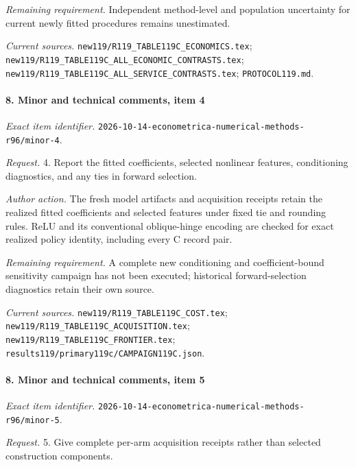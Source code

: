 \par\emph{Remaining requirement.} Independent method-level and population uncertainty for current newly fitted procedures remains unestimated.

\par\emph{Current sources.} \nolinkurl{new119/R119_TABLE119C_ECONOMICS.tex}; \nolinkurl{new119/R119_TABLE119C_ALL_ECONOMIC_CONTRASTS.tex}; \nolinkurl{new119/R119_TABLE119C_ALL_SERVICE_CONTRASTS.tex}; \nolinkurl{PROTOCOL119.md}.

\paragraph{8. Minor and technical comments, item 4}

\emph{Exact item identifier.} \nolinkurl{2026-10-14-econometrica-numerical-methods-r96/minor-4}.

\par\emph{Request.} 4. Report the fitted coefficients, selected nonlinear features, conditioning diagnostics, and any ties in forward selection.

\par\emph{Author action.} The fresh model artifacts and acquisition receipts retain the realized fitted coefficients and selected features under fixed tie and rounding rules. ReLU and its conventional oblique-hinge encoding are checked for exact realized policy identity, including every C record pair.

\par\emph{Remaining requirement.} A complete new conditioning and coefficient-bound sensitivity campaign has not been executed; historical forward-selection diagnostics retain their own source.

\par\emph{Current sources.} \nolinkurl{new119/R119_TABLE119C_COST.tex}; \nolinkurl{new119/R119_TABLE119C_ACQUISITION.tex}; \nolinkurl{new119/R119_TABLE119C_FRONTIER.tex}; \nolinkurl{results119/primary119c/CAMPAIGN119C.json}.

\paragraph{8. Minor and technical comments, item 5}

\emph{Exact item identifier.} \nolinkurl{2026-10-14-econometrica-numerical-methods-r96/minor-5}.

\par\emph{Request.} 5. Give complete per-arm acquisition receipts rather than selected construction components.


